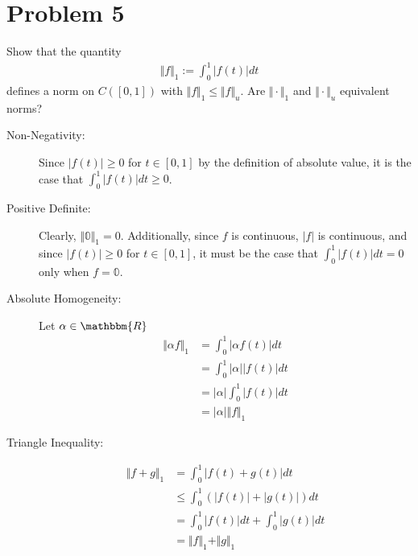 \documentclass[10pt]{extarticle}
\newcommand{\R}{\mathbbm{R}}
\begin{document}
  \section{Problem 5}%
  Show that the quantity
  \begin{align*}
    \Vert f \Vert_1 := \int_{0}^{1}|f(t)| dt
  \end{align*}
  defines a norm on $C([0,1])$ with $\Vert f\Vert_1 \leq \Vert f \Vert_u$. Are $\Vert \cdot \Vert_1$ and $\Vert \cdot \Vert_u$ equivalent norms?
  \begin{description}
    \item[Non-Negativity:] Since $|f(t)| \geq 0$ for $t\in [0,1]$ by the definition of absolute value, it is the case that $\int_{0}^{1}|f(t)|dt\geq 0$.
    \item[Positive Definite:] Clearly, $\Vert \mathbb{0}\Vert_1 = 0$. Additionally, since $f$ is continuous, $|f|$ is continuous, and since $|f(t)| \geq 0$ for $t\in [0,1]$, it must be the case that $\int_{0}^{1}|f(t)|dt = 0$ only when $f = \mathbb{0}$.
    \item[Absolute Homogeneity:] Let $\alpha\in\R$
      \begin{align*}
        \Vert \alpha f \Vert_1 &= \int_{0}^{1}|\alpha f(t)|dt\\
                               &= \int_{0}^{1}|\alpha||f(t)|dt\\
                               &= |\alpha|\int_{0}^{1}|f(t)|dt\\
                               &= |\alpha|\Vert f\Vert_1
      \end{align*}
    \item[Triangle Inequality:]
      \begin{align*}
        \Vert f + g \Vert_1 &= \int_{0}^{1}|f(t) + g(t)|dt\\
                            &\leq \int_{0}^{1}\left(|f(t)| + |g(t)|\right)dt\\
                            &= \int_{0}^{1}|f(t)|dt + \int_{0}^{1}|g(t)|dt\\
                            &= \Vert f \Vert_1 + \Vert g \Vert_1
      \end{align*}
  \end{description}
\end{document}
